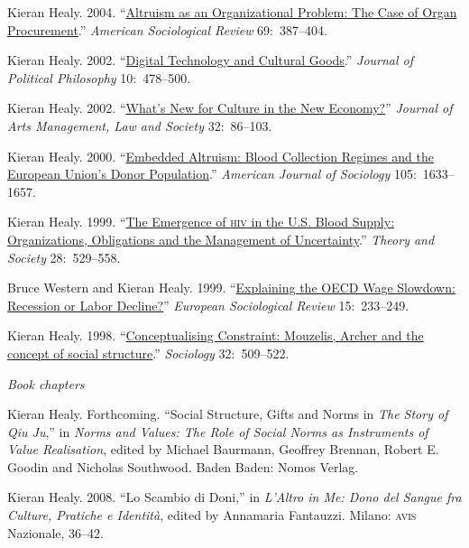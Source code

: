 \documentclass[11pt]{article}
\begin{document}
\ind Kieran Healy. 2004. ``\href{http://www.kieranhealy.org/files/papers/asr2004.pdf}{Altruism as an Organizational Problem: The Case of Organ Procurement}.''
 \emph{American Sociological Review} 69:~387--404.

\ind Kieran Healy. 2002. ``\href{http://www.kieranhealy.org/files/papers/jpp.pdf}{Digital Technology and Cultural Goods}.'' \emph{Journal of
  Political Philosophy} 10:~478--500. 

\ind Kieran Healy. 2002. ``\href{http://www.kieranhealy.org/files/papers/culture-newecon.pdf}{What's New for Culture in the New Economy?}'' \emph{Journal
  of Arts Management, Law and Society} 32:~86--103. 


\ind Kieran Healy. 2000. ``\href{http://www.kieranhealy.org/files/papers/embed-alt.pdf}{Embedded Altruism: Blood Collection Regimes and the European
  Union's Donor Population}.'' \emph{American Journal of Sociology} 105:~1633--\,1657.


\ind Kieran Healy. 1999.  ``\href{http://www.kieranhealy.org/files/papers/ts.pdf}{The Emergence of \textsc{hiv} in the U.S. Blood Supply: Organizations,
  Obligations and the Management of Uncertainty}.'' \emph{Theory and Society} 28:~529--558.


\ind Bruce Western and Kieran Healy. 1999. ``\href{http://www.kieranhealy.org/files/papers/western-healy99.pdf}{Explaining the OECD Wage Slowdown:
Recession or Labor Decline?}''  \emph{European Sociological Review}
15:~233--249.


\ind  Kieran Healy. 1998.  ``\href{http://www.kieranhealy.org/files/papers/constraint98.pdf}{Conceptualising Constraint: Mouzelis, Archer and the concept of
  social structure}.'' \emph{Sociology} 32:~509--522. 

\bigskip

\noindent\emph{Book chapters \vspace{0.05in}}

\ind Kieran Healy. Forthcoming. ``Social Structure, Gifts and Norms in \emph{The Story of Qiu Ju},'' in \emph{Norms and Values: The Role of Social Norms as Instruments of Value Realisation}, edited by Michael Baurmann, Geoffrey Brennan, Robert E. Goodin and Nicholas Southwood. Baden Baden: Nomos Verlag.

\ind Kieran Healy. 2008. ``Lo Scambio di Doni,'' in \emph{L'Altro in Me: Dono del Sangue fra Culture, Pratiche e Identità}, edited by Annamaria Fantauzzi. Milano: \textsc{avis} Nazionale, 36--42. 
\end{document}
